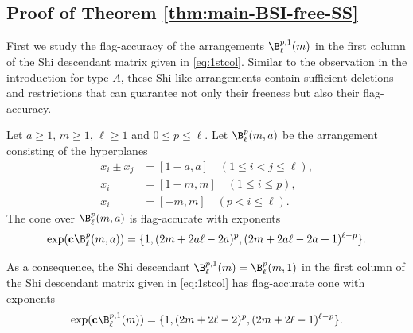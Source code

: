 \subsection{Proof of Theorem  \ref{thm:main-BSI-free-SS}}
\label{subsec:F-SS-BSI}
First we study the flag-accuracy of the arrangements $\B^{p,1}_\ell(m)$ in the first column of the Shi descendant matrix given in \eqref{eq:1stcol}. 
Similar to the observation in the introduction for type $A$, these Shi-like arrangements contain sufficient deletions and restrictions that can guarantee not only their freeness but also their flag-accuracy. 
\begin{theorem}
 \label{thm:k=1,l,m,p}
Let $a \ge 1$, $m\ge 1$,  $\ell \ge 1$ and $0 \le p \le \ell$. 
Let $\B^p_\ell(m,a)$ be the arrangement consisting of the hyperplanes
\begin{align*}
x_{i}\pm x_{j} &= [1-a , a]\quad  (1 \leq i < j \leq \ell), \\
x_i&=  [1-m , m] \quad (1 \leq   i \leq p), \\
x_i&=[-m , m]  \quad (p<  i \leq \ell).
\end{align*}
The cone over $\B^p_\ell(m,a)$ is flag-accurate with exponents 
$$\exp(\textbf{c}\B^p_\ell(m, a)) = \{1, (2m+2a\ell-2a)^{p}, (2m+2a\ell-2a+1 )^{\ell-p}\}.$$ 

As a consequence, the Shi descendant $\B^{p,1}_\ell(m) = \B^p_\ell(m, 1) $ in the first column of the Shi descendant matrix given in \eqref{eq:1stcol} has flag-accurate cone with exponents 
$$\exp(\textbf{c}\B^{p,1}_\ell(m)) = \{1, (2m+2\ell-2)^{p}, (2m+2\ell-1)^{\ell-p}\}.$$ 
 \end{theorem} 
 
